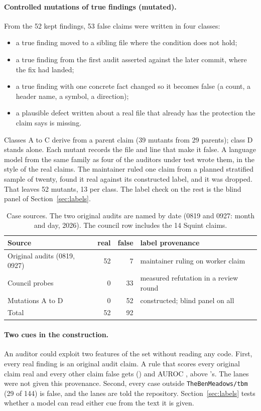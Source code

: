 \documentclass[11pt]{article}
\begin{document}
\paragraph{Controlled mutations of true findings (mutated).} From the 52 kept findings, 53 false claims were written in four classes:
\begin{itemize}
  \item[(A)] a true finding moved to a sibling file where the condition does not hold;
  \item[(B)] a true finding from the first audit asserted against the later commit, where the fix had landed;
  \item[(C)] a true finding with one concrete fact changed so it becomes false (a count, a header name, a symbol, a direction);
  \item[(D)] a plausible defect written about a real file that already has the protection the claim says is missing.
\end{itemize}
Classes A to C derive from a parent claim (39 mutants from 29 parents); class D stands alone. Each mutant records the file and line that make it false. A language model from the same family as four of the auditors under test wrote them, in the style of the real claims. The maintainer ruled one claim from a planned stratified sample of twenty, found it real against its constructed label, and it was dropped. That leaves 52 mutants, 13 per class. The label check on the rest is the blind panel of Section~\ref{sec:labels}.

\begin{table}[h]
\centering
\begin{tabular}{lrrl}
\toprule
Source & real & false & label provenance \\
\midrule
Original audits (0819, 0927) & 52 & 7 & maintainer ruling on worker claim \\
Council probes & 0 & 33 & measured refutation in a review round \\
Mutations A to D & 0 & 52 & constructed; blind panel on all \\
\midrule
Total & 52 & 92 & \\
\bottomrule
\end{tabular}
\caption{Case sources. The two original audits are named by date (0819 and 0927: month and day, 2026). The council row includes the 14 Squint claims.}
\label{tab:sources}
\end{table}

\paragraph{Two cues in the construction.} An auditor could exploit two features of the set without reading any code. First, every real finding is an original audit claim. A rule that scores every original claim real and every other claim false gets  () and AUROC , above 's. The lanes were not given this provenance. Second, every case outside \texttt{TheBenMeadows/tbm} (29 of 144) is false, and the lanes are told the repository. Section~\ref{sec:labels} tests whether a model can read either cue from the text it is given.
\end{document}
